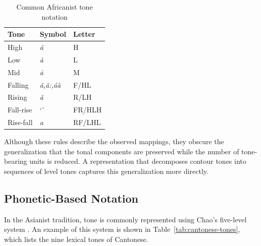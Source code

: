 \begin{table}[ht]
	\centering
	\caption{Common Africanist tone notation}
	\label{tab:africanist_updated}
	\begin{tabular}{lll}
		\hline
		\textbf{Tone} & \textbf{Symbol} & \textbf{Letter} \\
		\hline
		High      & \textit{á} & H      \\
		Low       & \textit{à} & L      \\
		Mid       & \textit{ā} & M      \\
		Falling   & \textit{â,â:,áà} & F/HL   \\
		Rising    & \textit{ǎ} & R/LH   \\
		Fall-rise & `\/\` & FR/HLH \\
		Rise-fall & \textit{a} & RF/LHL \\
		\hline
	\end{tabular}
\end{table}

Although these rules describe the observed mappings, they obscure the generalization 
that the tonal components are preserved while the number of tone-bearing units is 
reduced. A representation that decomposes contour tones into sequences of level tones 
captures this generalization more directly.

\subsection{Phonetic-Based Notation}

In the Asianist tradition, tone is commonly represented using Chao’s five-level 
system \citep{chao1930system}. An example of this system is shown in Table~\ref{tab:cantonese-tones}, which lists the nine lexical tones of Cantonese.

